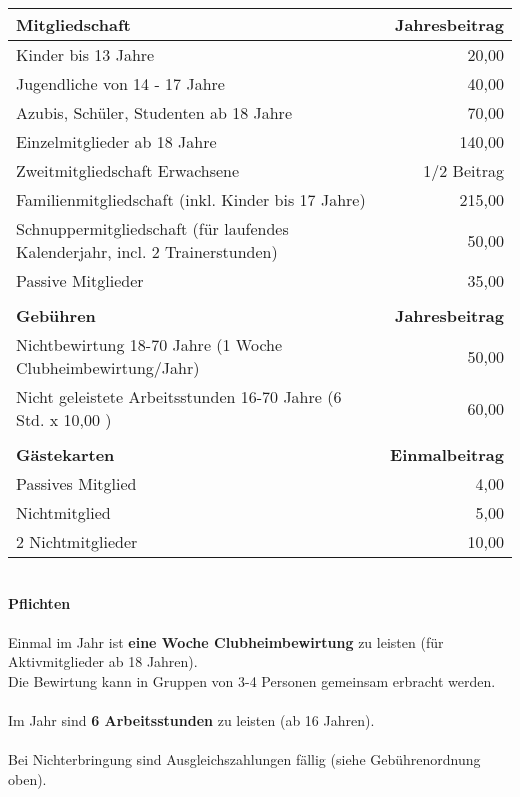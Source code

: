 \noindent
\begin{table}[H]
	\centering
	\begin{tabular}[c]{lr}
		\textbf{Mitgliedschaft} & \textbf{Jahresbeitrag}\\\hline
		Kinder bis 13 Jahre & 20,00\texteuro\\
		Jugendliche von 14 - 17 Jahre & 40,00\texteuro\\
		Azubis, Schüler, Studenten ab 18 Jahre & 70,00\texteuro\\
		Einzelmitglieder ab 18 Jahre & 140,00\texteuro\\
		Zweitmitgliedschaft Erwachsene & 1/2 Beitrag\\
		Familienmitgliedschaft (inkl. Kinder bis 17 Jahre) & 215,00\texteuro\\
		Schnuppermitgliedschaft (für laufendes Kalenderjahr, incl. 2 Trainerstunden) & 50,00\texteuro\\
		Passive Mitglieder & 35,00\texteuro\\
		&\\
		\textbf{Gebühren} & \textbf{Jahresbeitrag}\\\hline
		Nichtbewirtung 18-70 Jahre (1 Woche Clubheimbewirtung/Jahr) & 50,00\texteuro\\
		Nicht geleistete Arbeitsstunden 16-70 Jahre (6 Std. x 10,00 \texteuro) & 60,00\texteuro\\
		&\\
		\textbf{Gästekarten} & \textbf{Einmalbeitrag}\\\hline
		Passives Mitglied & 4,00\texteuro\\
		Nichtmitglied & 5,00\texteuro\\
		2 Nichtmitglieder & 10,00\texteuro\\
	\end{tabular}
\end{table}
\ \\
{
	\huge
	\centering
	\textbf{Pflichten}\\\ \\
}
\noindent
Einmal im Jahr ist \textbf{eine Woche Clubheimbewirtung} zu leisten (für Aktivmitglieder ab 18 Jahren).\\
Die Bewirtung kann in Gruppen von 3-4 Personen gemeinsam erbracht werden.\\\\
Im Jahr sind \textbf{6 Arbeitsstunden} zu leisten (ab 16 Jahren).\\\\
Bei Nichterbringung sind Ausgleichszahlungen fällig (siehe Gebührenordnung oben).\\\\
